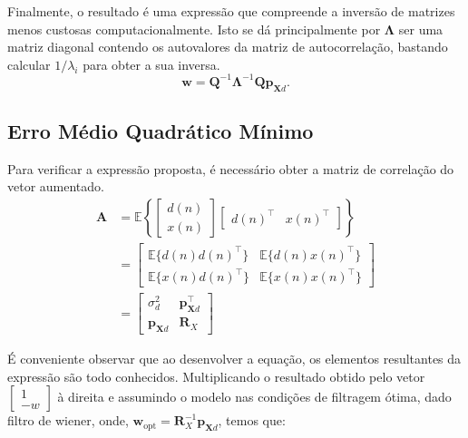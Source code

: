 Finalmente, o resultado é uma expressão que compreende a inversão de matrizes menos custosas computacionalmente. Isto se dá principalmente por $\mathbf{\Lambda}$ ser uma matriz diagonal contendo os autovalores da matriz de autocorrelação, bastando calcular $1/\lambda_{i}$ para obter a sua inversa.
\begin{equation}
    \mathbf{w} = \mathbf{Q}^{-1} \mathbf{\Lambda}^{-1} \mathbf{Q} \mathbf{p}_{\mathbf{X} d}.
\end{equation}
                                         

\subsection{Erro Médio Quadrático Mínimo} %
Para verificar a expressão proposta, é necessário obter a matriz de correlação do vetor aumentado.
\begin{align*}
    \mathbf{A} &= \mathbb{E} \left\{ \left[ \begin{matrix} d(n) \\ x(n) \end{matrix} \right] \left[ \begin{matrix} d(n)^{\top} & x(n)^{\top} \end{matrix} \right] \right\} \\
    &= \left[ \begin{matrix} \mathbb{E}\{d(n) d(n)^{\top}\} & \mathbb{E}\{d(n) x(n)^{\top}\} \\ \mathbb{E}\{x(n) d(n)^{\top}\} & \mathbb{E}\{x(n) x(n)^{\top}\} \end{matrix} \right] \\
    &=  \left[ \begin{matrix} \sigma^{2}_{d} & \mathbf{p}_{\mathbf{X} d}^{\top} \\
        \mathbf{p}_{\mathbf{X} d} & \mathbf{R}_{X} \end{matrix} \right]
\end{align*}

É conveniente observar que ao desenvolver a equação, os elementos resultantes da expressão são todo conhecidos. Multiplicando o resultado obtido pelo vetor $\left[\begin{matrix}1 \\ -w \end{matrix} \right]$ à direita e assumindo o modelo nas condições de filtragem ótima, dado filtro de wiener, onde, $\mathbf{w}_{\text{opt}} = \mathbf{R}^{-1}_{X} \mathbf{p}_{\mathbf{X} d}$, temos que:

